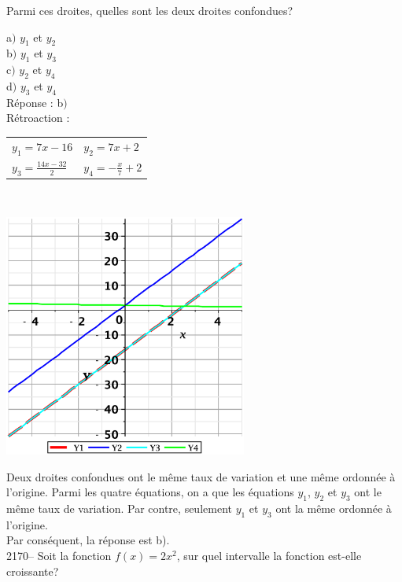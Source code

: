 \documentclass[letterpaper, 12pt]{article}
\begin{document}
Parmi ces droites, quelles sont les deux droites confondues?

a$)$ $ y_{1}$ et $ y_{2}$\\
b$)$ $ y_{1}$ et $ y_{3}$\\
c$)$ $ y_{2}$ et $ y_{4}$\\
d$)$ $ y_{3}$ et $ y_{4}$\\

R\'eponse : b$)$\\

R\'etroaction :
\begin{center}
\begin{tabular}{l l}
 $ y_{1}=7x-16 $ &  $ y_{2}=7x+2 $ \\
 $ y_{3}=\frac{14x-32}{2} $ &  $ y_{4}=-\frac{x}{7}+2 $ \\
\end{tabular}\\
\end{center}
\begin{center}
 \includegraphics[width=8cm,bb=20 118 575 673]{Q2168.eps}
\end{center}
Deux droites confondues ont le m\^eme taux de variation et une m\^eme ordonn\'ee \`a l'origine. Parmi les quatre \'equations, on a que les \'equations $ y_{1}$, $ y_{2}$ et $ y_{3}$ ont le m\^eme taux de variation. Par contre, seulement $ y_{1}$ et $ y_{3}$ ont la m\^eme ordonn\'ee \`a l'origine.\\
Par cons\'equent, la r\'eponse est b).\\


2170-- Soit la fonction $f(x)=2x^{2}$, sur quel intervalle la fonction est-elle croissante? \\
\end{document}
